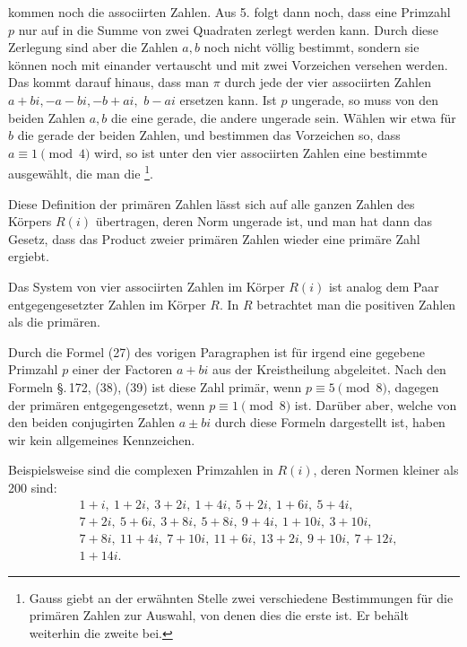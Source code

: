 kommen noch die associirten Zahlen. Aus 5. folgt dann noch,
dass eine Primzahl $p$ nur auf  in die Summe von zwei
Quadraten zerlegt werden kann. Durch diese Zerlegung sind
aber die Zahlen $a, b$ noch nicht völlig bestimmt, sondern sie
können noch mit einander vertauscht und mit zwei Vorzeichen
versehen werden. Das kommt darauf hinaus, dass man $\pi$ durch
jede der vier associirten Zahlen $a+bi, -a-bi, -b+ai,$
$b-ai$ ersetzen kann. Ist $p$ ungerade, so muss von den beiden
Zahlen $a, b$ die eine gerade, die andere ungerade sein. Wählen
wir etwa für $b$ die gerade der beiden Zahlen, und bestimmen
das Vorzeichen so, dass $a \equiv 1 \pmod{4}$ wird, so ist unter den
vier associirten Zahlen eine bestimmte ausgewählt, die man die
\footnote{Gauss giebt an der erwähnten Stelle zwei verschiedene Bestimmungen
 für die primären Zahlen zur Auswahl, von denen dies die erste
ist. Er behält weiterhin die zweite bei.}.

Diese Definition der primären Zahlen lässt sich auf alle
ganzen Zahlen des Körpers $R(i)$ übertragen, deren Norm ungerade
 ist, und man hat dann das Gesetz, dass das Product
zweier primären Zahlen wieder eine primäre Zahl ergiebt.

Das System von vier associirten Zahlen im Körper $R(i)$ ist
analog dem Paar entgegengesetzter Zahlen im Körper $R$. In $R$
betrachtet man die positiven Zahlen als die primären.

Durch die Formel (27) des vorigen Paragraphen ist für
irgend eine gegebene Primzahl $p$ einer der Factoren $a+bi$ aus
der Kreistheilung abgeleitet. Nach den Formeln \S.\,172, (38), (39)
ist diese Zahl primär, wenn $p \equiv 5 \pmod{8}$, dagegen der primären
 entgegengesetzt, wenn $p \equiv 1 \pmod{8}$ ist. Darüber aber,
welche von den beiden conjugirten Zahlen $a \pm bi$ durch diese
Formeln dargestellt ist, haben wir kein allgemeines Kennzeichen.

Beispielsweise sind die complexen Primzahlen in $R(i)$, deren
Normen kleiner als 200 sind:
\[
\begin{aligned}
&1+i,\ 1+2i,\ 3+2i,\ 1+4i,\ 5+2i,\ 1+6i,\ 5+4i,\\
&7+2i,\ 5+6i,\ 3+8i,\ 5+8i,\ 9+4i,\ 1+10i,\ 3+10i,\\
&7+8i,\ 11+4i,\ 7+10i,\ 11+6i,\ 13+2i,\ 9+10i,\ 7+12i,\\
&1+14i.
\end{aligned}
\]
